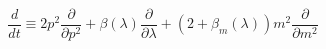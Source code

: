 \begin{equation}
\frac{d}{dt} \equiv 2 p^2 \frac{\partial}{\partial p^2} + \beta
(\lambda) \frac{\partial}{\partial \lambda} + (2 + \beta_m (\lambda))
m^2 \frac{\partial}{\partial m^2}
\end{equation}

